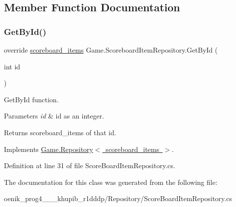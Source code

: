 \subsection{Member Function Documentation}
\mbox{\label{class_game_1_1_scoreboard_item_repository_acd35ca45dedeb7e13634a08185f704e8}} 
\subsubsection{\texorpdfstring{GetById()}{GetById()}}
{\footnotesize\ttfamily override \mbox{\hyperlink{class_game_1_1_data_1_1scoreboard__items}{scoreboard\+\_\+items}} Game.\+Scoreboard\+Item\+Repository.\+Get\+By\+Id (\begin{DoxyParamCaption}\item[{int}]{id }\end{DoxyParamCaption})\hspace{0.3cm}{\ttfamily [virtual]}}



Get\+By\+Id function. 


\begin{DoxyParams}{Parameters}
{\em id} & id as an integer.\\
\hline
\end{DoxyParams}
\begin{DoxyReturn}{Returns}
scoreboard\+\_\+items of that id.
\end{DoxyReturn}


Implements \mbox{\hyperlink{class_game_1_1_repository_aa59d0df964f75cb36b0cf39e55bdb626}{Game.\+Repository$<$ scoreboard\+\_\+items $>$}}.



Definition at line 31 of file Score\+Board\+Item\+Repository.\+cs.



The documentation for this class was generated from the following file\+:\begin{DoxyCompactItemize}
\item 
oenik\+\_\+prog4\+\_\+\_\+\_\+khupib\+\_\+r1dddp/\+Repository/Score\+Board\+Item\+Repository.\+cs\end{DoxyCompactItemize}
